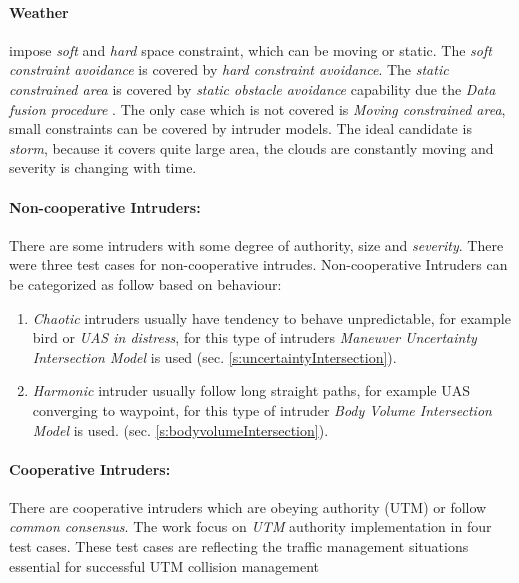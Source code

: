 \paragraph{Weather} impose  \emph{soft} and \emph{hard} space constraint, which can be moving or static. The \emph{soft constraint avoidance} is covered by \emph{hard constraint avoidance}. The \emph{static constrained area} is covered by \emph{static obstacle avoidance} capability due the \emph{Data fusion procedure} \cite{gomola2017probabilistic}. The only case which is not covered is \emph{Moving constrained area}, small constraints can be covered by intruder models. The ideal candidate is \emph{storm}, because it covers quite large area, the clouds are constantly moving and severity is changing with time.
    
\paragraph{Non-cooperative Intruders:} There are some intruders with some degree of authority, size and \emph{severity}. There were three test cases for non-cooperative intrudes. Non-cooperative Intruders can be categorized as follow based on behaviour:
\begin{enumerate}
    \item\emph{Chaotic} intruders usually have tendency to behave unpredictable, for example bird or \emph{UAS in distress}, for this type of intruders \emph{Maneuver Uncertainty  Intersection Model} is used (sec. \ref{s:uncertaintyIntersection}).
    
    \item\emph{Harmonic} intruder usually follow long straight paths, for example UAS converging to waypoint, for this type of intruder \emph{Body Volume Intersection Model} is used. (sec. \ref{s:bodyvolumeIntersection}).
\end{enumerate}

\paragraph{Cooperative Intruders:} There are cooperative intruders which are obeying authority (UTM) or follow \emph{common consensus}. The work focus on \emph{UTM} authority implementation in four test cases. These test cases are reflecting the traffic management situations essential for successful UTM collision management



